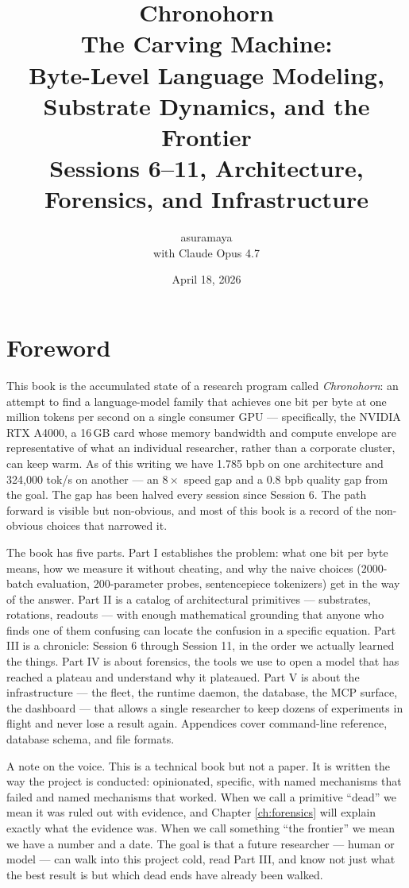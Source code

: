 \documentclass[11pt,openany]{book}
\title{%
  \textbf{Chronohorn} \\
  \large The Carving Machine: \\
  Byte-Level Language Modeling, \\
  Substrate Dynamics, and the Frontier \\[1em]
  \normalsize Sessions 6--11, Architecture, Forensics, and Infrastructure}
\author{asuramaya \\ with Claude Opus 4.7}
\date{April 18, 2026}
\theoremstyle{definition}
\theoremstyle{plain}
\begin{document}
\frontmatter
\maketitle

\tableofcontents

\chapter*{Foreword}

This book is the accumulated state of a research program called \emph{Chronohorn}:
an attempt to find a language-model family that achieves one bit per byte at one
million tokens per second on a single consumer GPU --- specifically, the
NVIDIA RTX A4000, a 16\,GB card whose memory bandwidth and compute envelope
are representative of what an individual researcher, rather than a corporate
cluster, can keep warm. As of this writing we have 1.785 bpb on one
architecture and 324{,}000 tok/s on another --- an $8\times$ speed gap and a
$0.8$ bpb quality gap from the goal. The gap has been halved every session
since Session 6. The path forward is visible but non-obvious, and most of
this book is a record of the non-obvious choices that narrowed it.

The book has five parts. Part I establishes the problem: what one bit per byte
means, how we measure it without cheating, and why the naive choices
($2000$-batch evaluation, 200-parameter probes, sentencepiece tokenizers)
get in the way of the answer. Part II is a catalog of architectural primitives
--- substrates, rotations, readouts --- with enough mathematical grounding
that anyone who finds one of them confusing can locate the confusion in a
specific equation. Part III is a chronicle: Session 6 through Session 11, in
the order we actually learned the things. Part IV is about forensics, the
tools we use to open a model that has reached a plateau and understand why it
plateaued. Part V is about the infrastructure --- the fleet, the runtime
daemon, the database, the MCP surface, the dashboard --- that allows a single
researcher to keep dozens of experiments in flight and never lose a result
again. Appendices cover command-line reference, database schema, and file
formats.

A note on the voice. This is a technical book but not a paper. It is written
the way the project is conducted: opinionated, specific, with named
mechanisms that failed and named mechanisms that worked. When we call a
primitive ``dead'' we mean it was ruled out with evidence, and Chapter
\ref{ch:forensics} will explain exactly what the evidence was. When we call
something ``the frontier'' we mean we have a number and a date. The goal is
that a future researcher --- human or model --- can walk into this project
cold, read Part III, and know not just what the best result is but which
dead ends have already been walked.
\end{document}
